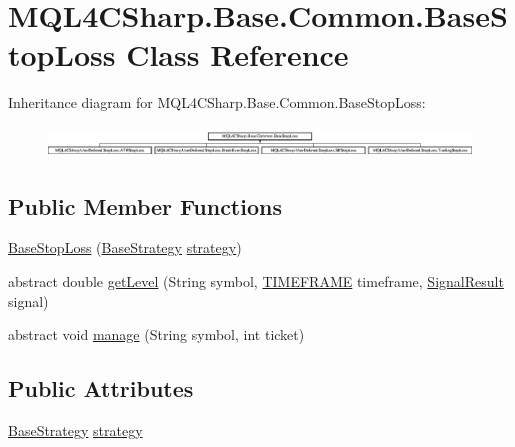 \hypertarget{class_m_q_l4_c_sharp_1_1_base_1_1_common_1_1_base_stop_loss}{}\section{M\+Q\+L4\+C\+Sharp.\+Base.\+Common.\+Base\+Stop\+Loss Class Reference}
\label{class_m_q_l4_c_sharp_1_1_base_1_1_common_1_1_base_stop_loss}
Inheritance diagram for M\+Q\+L4\+C\+Sharp.\+Base.\+Common.\+Base\+Stop\+Loss\+:\begin{figure}[H]
\begin{center}
\leavevmode
\includegraphics[height=0.813953cm]{class_m_q_l4_c_sharp_1_1_base_1_1_common_1_1_base_stop_loss}
\end{center}
\end{figure}
\subsection*{Public Member Functions}
\begin{DoxyCompactItemize}
\item 
\hyperlink{class_m_q_l4_c_sharp_1_1_base_1_1_common_1_1_base_stop_loss_a8402c5fc520192259befc1f37c16d47f}{Base\+Stop\+Loss} (\hyperlink{class_m_q_l4_c_sharp_1_1_base_1_1_base_strategy}{Base\+Strategy} \hyperlink{class_m_q_l4_c_sharp_1_1_base_1_1_common_1_1_base_stop_loss_a8cbd2ea8e6ab4e5af253a32116905162}{strategy})
\item 
abstract double \hyperlink{class_m_q_l4_c_sharp_1_1_base_1_1_common_1_1_base_stop_loss_af460cbf6d32f911f5628fa81915b926b}{get\+Level} (String symbol, \hyperlink{namespace_m_q_l4_c_sharp_1_1_base_1_1_enums_a838810aaa87c63c12737408dba8c0b35}{T\+I\+M\+E\+F\+R\+A\+ME} timeframe, \hyperlink{class_m_q_l4_c_sharp_1_1_base_1_1_common_1_1_signal_result}{Signal\+Result} signal)
\item 
abstract void \hyperlink{class_m_q_l4_c_sharp_1_1_base_1_1_common_1_1_base_stop_loss_ae1d01dadd0a5c0c29adcf5ed31ce509c}{manage} (String symbol, int ticket)
\end{DoxyCompactItemize}
\subsection*{Public Attributes}
\begin{DoxyCompactItemize}
\item 
\hyperlink{class_m_q_l4_c_sharp_1_1_base_1_1_base_strategy}{Base\+Strategy} \hyperlink{class_m_q_l4_c_sharp_1_1_base_1_1_common_1_1_base_stop_loss_a8cbd2ea8e6ab4e5af253a32116905162}{strategy}
\end{DoxyCompactItemize}


